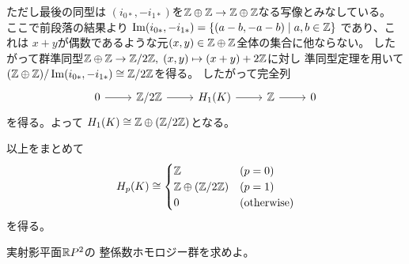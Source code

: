 \documentclass[report]{jlreq}
\begin{document}
\begin{answer}
    ただし最後の同型は
    $(i_{0*}, -i_{1*})$を$\mathbb{Z} \oplus \mathbb{Z} \to \mathbb{Z} \oplus \mathbb{Z}$なる写像とみなしている。
    ここで前段落の結果より
    $\operatorname{\mathrm{Im}} (i_{0*}, -i_{1*}) = \{ (a - b, - a - b) \mid a, b \in \mathbb{Z} \}$
    であり、これは
    $x + y$が偶数であるような元$(x, y) \in \mathbb{Z} \oplus \mathbb{Z}$全体の集合に他ならない。
    したがって群準同型$\mathbb{Z} \oplus \mathbb{Z} \to \mathbb{Z} / 2\mathbb{Z}, \;
    (x, y) \mapsto (x + y) + 2\mathbb{Z}$に対し
    準同型定理を用いて
    $(\mathbb{Z} \oplus \mathbb{Z}) / \operatorname{\mathrm{Im}} (i_{0*}, -i_{1*}) \cong \mathbb{Z} / 2\mathbb{Z}$を得る。
    したがって完全列
    \begin{equation}
        \begin{tikzcd}
            0 \ar{r}
                & \Z / 2\Z \ar{r}
                & H_1(K) \ar{r}
                & \Z \ar{r}
                & 0
        \end{tikzcd}
    \end{equation}
    を得る。よって
    $H_1(K) \cong \mathbb{Z} \oplus (\mathbb{Z} / 2\mathbb{Z})$となる。

    以上をまとめて
    \begin{equation}
        H_p(K) \cong \begin{cases}
            \mathbb{Z} & (p = 0) \\
            \mathbb{Z} \oplus (\mathbb{Z} / 2\mathbb{Z}) & (p = 1) \\
            0 & (\text{otherwise})
        \end{cases}
    \end{equation}
    を得る。
\end{answer}

\begin{problem}
    実射影平面$\mathbb{R} P^2$の
    整係数ホモロジー群を求めよ。
\end{problem}
\end{document}
